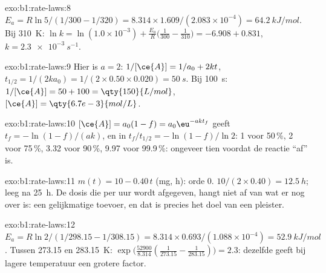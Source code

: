 \begin{solution}{exo:b1:rate-laws:8}
$E_a = R\ln5/(1/300 - 1/320) = 8.314 \times 1.609/(2.083 \times 10^{-4}) =
\qty{64.2}{kJ/mol}$. Bij \qty{310}{K}: $\ln k = \ln(1.0 \times 10^{-3}) +
\frac{E_a}{R}\big(\frac{1}{300} - \frac{1}{310}\big) = -6.908 + 0.831$,
$k = \qty{2.3e-3}{s^{-1}}$.
\end{solution}

\begin{solution}{exo:b1:rate-laws:9}
Hier is $a = 2$: $1/[\ce{A}] = 1/a_0 + 2kt$, $t_{1/2} = 1/(2k a_0) = 1/(2
\times 0.50 \times 0.020) = \qty{50}{s}$. Bij \qty{100}{s}: $1/[\ce{A}] = 50
+ 100 = \qty{150}{L/mol}$, $[\ce{A}] = \qty{6.7e-3}{mol/L}$.
\end{solution}

\begin{solution}{exo:b1:rate-laws:10}
$[\ce{A}] = a_0(1 - f) = a_0\eu^{-akt_f}$ geeft $t_f = -\ln(1-f)/(ak)$, en
in  $t_f/t_{1/2} = -\ln(1-f)/\ln2$: 1 voor 50\,\%, 2 voor
75\,\%, 3.32 voor 90\,\%, 9.97 voor 99.9\,\%: ongeveer tien
 voordat de reactie ``af'' is.
\end{solution}

\begin{solution}{exo:b1:rate-laws:11}
$m(t) = 10 - 0.40\,t$ (\unit{mg}, \unit{h}): orde 0. 
$10/(2 \times 0.40) = \qty{12.5}{h}$; leeg na \qty{25}{h}. De dosis die
per uur wordt afgegeven, hangt niet af van wat er nog over is: een
gelijkmatige toevoer, en dat is precies het doel van een pleister.
\end{solution}

\begin{solution}{exo:b1:rate-laws:12}
$E_a = R\ln2/(1/298.15 - 1/308.15) = 8.314 \times 0.693/(1.088 \times
10^{-4}) = \qty{52.9}{kJ/mol}$. Tussen 273.15 en \qty{283.15}{K}:
$\exp\big(\frac{52900}{8.314}(\frac{1}{273.15} - \frac{1}{283.15})\big) =
2.3$: dezelfde  geeft bij lagere temperatuur een
grotere factor.
\end{solution}

